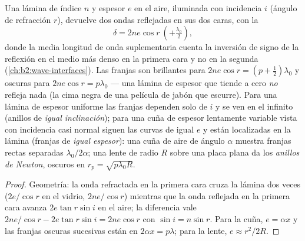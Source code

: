 \begin{proposition}\label{prop:b2:two-wave-interference:film}
Una lámina de índice $n$ y espesor $e$ en el aire, iluminada con incidencia $i$
(ángulo de refracción $r$), devuelve dos ondas reflejadas en sus dos caras,
con la 
\[
\delta = 2ne\cos r \ (+\tfrac{\lambda_0}2) ,
\]
donde la media longitud de onda suplementaria cuenta la inversión de signo de la reflexión
en el medio más denso en la primera cara y no en la segunda
(\cref{ch:b2:wave-interfaces}). Las franjas son brillantes para $2ne\cos r =
(p + \tfrac12)\lambda_0$ y oscuras para $2ne\cos r = p\lambda_0$ --- una lámina de espesor
que tiende a cero \emph{no} refleja nada (la cima negra de una película de jabón
que escurre). Para una lámina de espesor uniforme las franjas dependen solo de $i$
y se ven en el infinito (anillos de \emph{igual inclinación}); para una
cuña de espesor lentamente variable vista con incidencia casi normal
siguen las curvas de igual $e$ y están localizadas en la lámina
(franjas de \emph{igual espesor}): una cuña de aire de ángulo $\alpha$ muestra
franjas rectas separadas $\lambda_0/2\alpha$; una lente de radio $R$ sobre una placa plana da los
\emph{anillos de Newton}, oscuros en $r_p = \sqrt{p\lambda_0R}$.
\end{proposition}

\begin{proof}
Geometría: la onda refractada en la primera cara cruza la lámina dos veces
($2e/\cos r$ en el vidrio,  $2ne/\cos r$) mientras que la onda reflejada
en la primera cara avanza $2e\tan r\sin i$ en el aire; la diferencia vale
$2ne/\cos r - 2e\tan r\sin i = 2ne\cos r$ con $\sin i = n\sin r$. Para la
cuña, $e = \alpha x$ y las franjas oscuras sucesivas están en $2\alpha x = p\lambda$; para la
lente, $e \approx r^2/2R$.
\end{proof}

